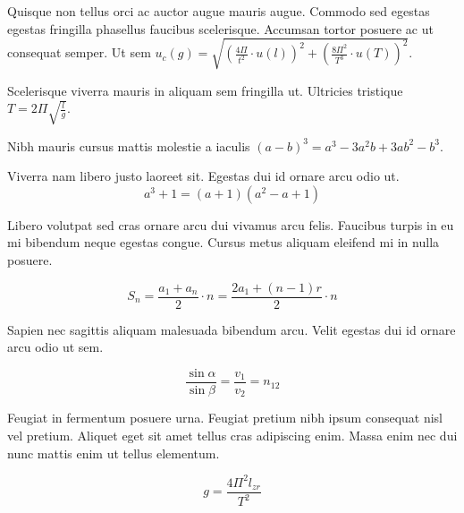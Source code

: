 \documentclass{article}
\begin{document}
Quisque non tellus orci ac auctor augue mauris augue. Commodo sed egestas egestas fringilla phasellus faucibus scelerisque. Accumsan tortor posuere ac ut consequat semper. Ut sem \begin{math}
	u_c(g)=\sqrt{(\frac{4\Pi}{t^2}\cdot u(l))^2+(\frac{8\Pi^2}{T^3}\cdot u(T))^2}
\end{math}.\newline

Scelerisque viverra mauris in aliquam sem fringilla ut. Ultricies tristique $ T=2\Pi \sqrt{\frac{l}{g}} $.\newline

Nibh mauris cursus mattis molestie a iaculis \( (a-b)^{3}=a^{3}-3a^{2}b+3ab^{2}-b^{3} \).\newline

Viverra nam libero justo laoreet sit. Egestas dui id ornare arcu odio ut.
\[ a^{3}+1=(a+1)(a^{2}-a+1) \]

Libero volutpat sed cras ornare arcu dui vivamus arcu felis. Faucibus turpis in eu mi bibendum neque egestas congue. Cursus metus aliquam eleifend mi in nulla posuere.

$$ S_{n}=\frac{a_{1}+a_{n}}{2}\cdot n=\frac{2a_{1}+(n-1)r}{2}\cdot n $$

Sapien nec sagittis aliquam malesuada bibendum arcu. Velit egestas dui id ornare arcu odio ut sem. 

\begin{displaymath}
	\frac{\sin \alpha}{\sin \beta}=\frac{v_1}{v_2}=n_{12}
\end{displaymath}

Feugiat in fermentum posuere urna. Feugiat pretium nibh ipsum consequat nisl vel pretium. Aliquet eget sit amet tellus cras adipiscing enim. Massa enim nec dui nunc mattis enim ut tellus elementum.

\begin{equation}
	g=\frac{4\Pi^2l_{zr}}{T^2}
\end{equation}
\end{document}
